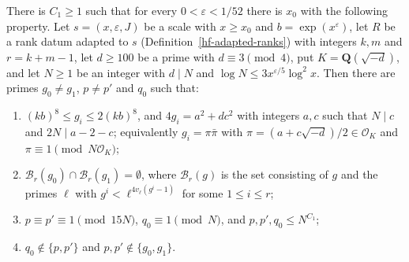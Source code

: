 \begin{lemma}\label{hf-norm-primes}
There is $C_1\geq1$ such that for every $0<\varepsilon<1/52$ there is $x_0$ with the following
property. Let $s=(x,\varepsilon,J)$ be a scale with $x\geq x_0$ and $b=\exp(x^\varepsilon)$, let $R$ be
a rank datum adapted to $s$ (Definition~\ref{hf-adapted-ranks}) with integers $k,m$ and $r=k+m-1$, let
$d\geq100$ be a prime with $d\equiv3\pmod4$, put $K=\mathbf Q(\sqrt{-d})$, and let $N\geq1$ be an
integer with $d\mid N$ and $\log N\leq3x^{\varepsilon/5}\log^2x$. Then there are primes $g_0\neq g_1$, $p\neq p'$ and $q_0$ such
that:
\begin{enumerate}
\item $(kb)^8\leq g_i\leq2(kb)^8$, and $4g_i=a^2+dc^2$ with integers $a,c$ such that $N\mid c$ and
  $2N\mid a-2-c$; equivalently $g_i=\pi\bar\pi$ with $\pi=(a+c\sqrt{-d})/2\in\mathcal O_K$ and
  $\pi\equiv1\pmod{N\mathcal O_K}$;
\item $\mathcal B_r(g_0)\cap\mathcal B_r(g_1)=\emptyset$, where $\mathcal B_r(g)$ is the set
  consisting of $g$ and the primes $\ell$ with $g^i<\ell^{4v_\ell(g^i-1)}$ for some $1\leq i\leq r$;
\item $p\equiv p'\equiv1\pmod{15N}$, $q_0\equiv1\pmod N$, and $p,p',q_0\leq N^{C_1}$;
\item $q_0\notin\{p,p'\}$ and $p,p'\notin\{g_0,g_1\}$.
\end{enumerate}
\end{lemma}

